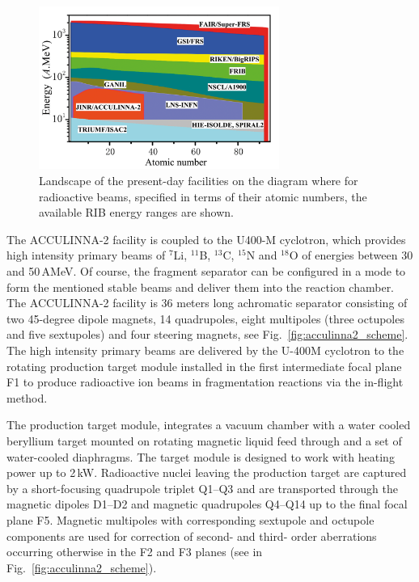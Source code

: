 \begin{figure}[t]
	\begin{center}
		\includegraphics[width=0.7\textwidth]{figures/acculinna2_part.png}
	\end{center}
	\caption{
		Landscape of the present-day facilities on the diagram where for radioactive beams, specified in terms of their atomic numbers, the available RIB energy ranges are shown.}
	\label{fig:acculinna2_worldplace}
\end{figure}

The ACCULINNA-2 facility is coupled to the U400-M cyclotron, which provides high intensity primary beams of $^{7}$Li, $^{11}$B, $^{13}$C, $^{15}$N and $^{18}$O of energies  between 30 and 50\,AMeV.
Of course, the fragment separator can be configured in a mode to form the mentioned stable beams and deliver them into the reaction chamber.  
The ACCULINNA-2 facility is 36 meters long achromatic separator consisting of two 45-degree dipole magnets, 14 quadrupoles, eight multipoles (three octupoles and five sextupoles) and four steering magnets, see Fig.\ \ref{fig:acculinna2_scheme}.
The high intensity primary beams are delivered by the U-400M cyclotron to the rotating production target module installed in the first intermediate focal plane F1 to produce radioactive ion beams in fragmentation reactions via the in-flight method.

The production target module, integrates a vacuum chamber with a water cooled beryllium target mounted on rotating magnetic liquid feed through and a set of water-cooled diaphragms. 
The target module is designed to work with heating power up to 2\,kW. 
Radioactive nuclei leaving the production target are captured by a short-focusing quadrupole triplet Q1–Q3 and are transported through the magnetic dipoles D1–D2 and magnetic quadrupoles Q4–Q14 up to the final focal plane F5. 
Magnetic multipoles with corresponding sextupole and octupole components are used for correction of second- and third- order aberrations occurring otherwise in the F2 and F3 planes (see in Fig.\ \ref{fig:acculinna2_scheme}). 

